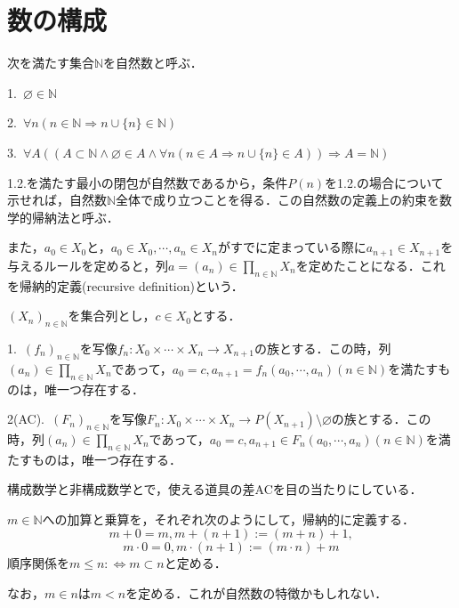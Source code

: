 \documentclass[uplatex, 12pt, dvipdfmx]{jsreport}
\begin{document}
\section{数の構成}

\begin{definition}\rm{}
    次を満たす集合$\mathbb{N}$を自然数と呼ぶ．

    1.\, $\varnothing\in\mathbb{N}$

    2.\, $\forall n(n\in\mathbb{N}\Rightarrow n\cup\{ n\}\in\mathbb{N})$

    3.\, $\forall A((A\subset\mathbb{N}\wedge\varnothing\in A\wedge\forall n(n\in A\Rightarrow n\cup\{n\}\in A))\Rightarrow A=\mathbb{N})$
\end{definition}
\begin{remark}\rm{}
    1.2.を満たす最小の閉包が自然数であるから，条件$P(n)$を1.2.の場合について示せれば，自然数$\mathbb{N}$全体で成り立つことを得る．この自然数の定義上の約束を数学的帰納法と呼ぶ．

    また，$a_0\in X_0$と，$a_0\in X_0,\cdots,a_n\in X_n$がすでに定まっている際に$a_{n+1}\in X_{n+1}$を与えるルールを定めると，列$a=(a_n)\in\prod_{n\in\mathbb{N}}X_n$を定めたことになる．これを帰納的定義(recursive definition)という．
\end{remark}

\begin{proposition}\rm{}
    $(X_n)_{n\in\mathbb{N}}$を集合列とし，$c\in X_0$とする．

    1.\, $(f_n)_{n\in\mathbb{N}}$を写像$f_n:X_0\times\cdots\times X_n\to X_{n+1}$の族とする．この時，列$(a_n)\in\prod_{n\in\mathbb{N}}X_n$であって，$a_0=c, a_{n+1}=f_n(a_0,\cdots,a_n)(n\in\mathbb{N})$を満たすものは，唯一つ存在する．

    2(AC).\, $(F_n)_{n\in\mathbb{N}}$を写像$F_n:X_0\times\cdots\times X_n\to P(X_{n+1})\setminus\varnothing$の族とする．この時，列$(a_n)\in\prod_{n\in\mathbb{N}}X_n$であって，$a_0=c, a_{n+1}\in F_n(a_0,\cdots,a_n)(n\in\mathbb{N})$を満たすものは，唯一つ存在する．
\end{proposition}
\begin{remark}\rm{}
    構成数学と非構成数学とで，使える道具の差ACを目の当たりにしている．
\end{remark}

\begin{definition}
    $m\in\mathbb{N}$への加算と乗算を，それぞれ次のようにして，帰納的に定義する．
    \[ m+0=m, m+(n+1):=(m+n)+1, \]\[ m\cdot 0=0, m\cdot (n+1):=(m\cdot n)+m \]
    順序関係を$m\le n:\Leftrightarrow m\subset n$と定める．
\end{definition}
\begin{remark}
    なお，$m\in n$は$m<n$を定める．これが自然数の特徴かもしれない．
\end{remark}
\end{document}
